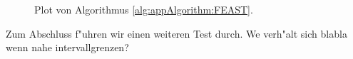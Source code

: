 \newpage

\begin{figure}[h!]
\centering


\caption{Plot von Algorithmus \ref{alg:appAlgorithm:FEAST}.}\label{fig:chap5:feast}
\end{figure}

Zum Abschluss f"uhren wir einen weiteren Test durch. We verh"alt sich blabla wenn nahe intervallgrenzen?
